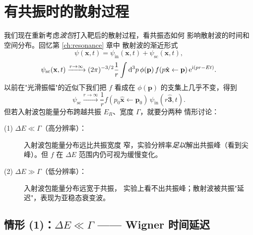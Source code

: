 \section{有共振时的散射过程}\label{sec:scatt-with-res}

我们现在重新考虑\emph{波包}打入靶后的散射过程，看共振态如何
影响散射波的时间和空间分布。回忆第 \ref{ch:resonance} 章中
散射波的渐近形式
\begin{equation}
  \psi(\mathbf x,t)=\psi_{\mathrm{in}}(\mathbf x,t)+\psi_{\mathrm{sc}}(\mathbf x,t),
\end{equation}
\begin{equation}\label{eq:psi-sc-asymp}
  \psi_{\mathrm{sc}}(\mathbf x,t)\xrightarrow{r\to\infty}
  (2\pi)^{-3/2}\frac{1}{r}\int\mathrm{d}^3 p\,\phi(\mathbf p)\,
  f(p\hat{\mathbf x}\leftarrow\mathbf p)\,\mathrm{e}^{\mathrm{i}(p r-E t)}.
\end{equation}
以前在"光滑振幅"的近似下我们把 $f$ 看成在 $\phi(\mathbf p)$
的支集上几乎不变，得到
\begin{equation}
  \psi_{\mathrm{sc}}\xrightarrow{r\to\infty}\frac{1}{r}f(p_0\hat{\mathbf x}\leftarrow\mathbf p_0)\,
  \psi_{\mathrm{in}}(r\hat{\mathbf 3},t).
\end{equation}
但若入射波包能量分布跨越共振 $E_R$、宽度 $\Gamma$，就要分两种
情形讨论：
\begin{description}
  \item[(1) $\Delta E\ll\Gamma$（高分辨率）：] 入射波包能量分布远比共振宽度
    窄，实验分辨率\emph{足以}解出共振峰（看到尖峰）。但 $f$ 在
    $\Delta E$ 范围内仍可视为缓慢变化。
  \item[(2) $\Delta E\gg\Gamma$（低分辨率）：] 入射波包能量分布远宽于共振，
    实验上看不出共振峰；散射波被共振"延迟"，表现为亚稳态衰变波。
\end{description}

\subsection{情形 (1)：$\Delta E\ll\Gamma$ —— Wigner 时间延迟}

